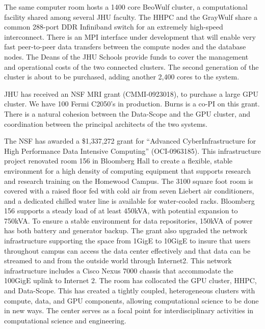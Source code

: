 \documentclass[11pt]{nih}
\begin{document}
% 
The same computer room hosts a 1400 core BeoWulf cluster, a computational facility shared among several JHU faculty.  The HHPC and the GrayWulf share a common 288-port DDR Infiniband switch for an extremely high-speed interconnect. There is an MPI interface under development that will enable very fast peer-to-peer data transfers between the compute nodes and the database nodes. The Deans of the JHU Schools provide funds to cover the management and operational costs of the two connected clusters. The second generation of the cluster is about to be purchased, adding another 2,400 cores to the system.


% 
JHU has received an NSF MRI grant (CMMI-0923018), to purchase a large GPU cluster. We have 100 Fermi C2050's in production. Burns is a co-PI on this grant. There is a natural cohesion between the Data-Scope and the GPU cluster, and coordination between the principal architects of the two systems.


% 
The NSF has awarded a \$1,337,272 grant for ``Advanced CyberInfrastructure for High Performance Data Intensive Computing'' (OCI-0963185). This infrastructure project renovated room 156 in Bloomberg Hall to create a flexible, stable environment for a high density of computing equipment that supports research and research training on the Homewood Campus. The 3100 square foot room is covered with a raised floor fed with cold air from seven Liebert air conditioners, and a dedicated chilled water line is available for water-cooled racks. Bloomberg 156 supports a steady load of at least 450kVA, with potential expansion to 750kVA. To ensure a stable environment for data repositories, 150kVA of power has both battery and generator backup. The grant also upgraded the network infrastructure supporting the space from 1GigE to 10GigE to insure that users throughout campus can access the data center effectively and that data can be streamed to and from the outside world through Internet2.  This network infrastructure includes a Cisco Nexus 7000 chassis that accommodate the 100GigE uplink to Internet 2. The room has collocated the GPU cluster, HHPC, and Data-Scope. This has created a tightly coupled, heterogeneous clusters with compute, data, and GPU components, allowing computational science to be done in new ways. The center serves as a focal point for interdisciplinary activities in computational science and engineering. 
\end{document}
